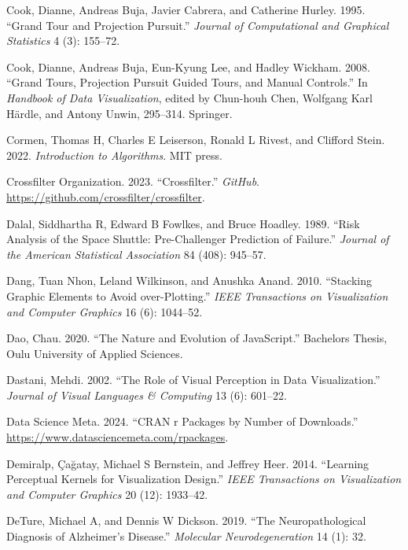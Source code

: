 \documentclass[
  openany]{book}
\newlength{\cslhangindent}
\newenvironment{CSLReferences}[2] %
 {\begin{list}{}{%
  \setlength{\itemindent}{0pt}
  \setlength{\leftmargin}{0pt}
  \setlength{\parsep}{0pt}
  \ifodd #1
   \setlength{\leftmargin}{\cslhangindent}
   \setlength{\itemindent}{-1\cslhangindent}
  \fi
  \setlength{\itemsep}{#2\baselineskip}}}
 {\end{list}}
\theoremstyle{definition}
\theoremstyle{definition}
\theoremstyle{definition}
\theoremstyle{definition}
\theoremstyle{remark}
\begin{document}
\begin{CSLReferences}{1}{0}
Cook, Dianne, Andreas Buja, Javier Cabrera, and Catherine Hurley. 1995. {``Grand Tour and Projection Pursuit.''} \emph{Journal of Computational and Graphical Statistics} 4 (3): 155--72.

Cook, Dianne, Andreas Buja, Eun-Kyung Lee, and Hadley Wickham. 2008. {``Grand Tours, Projection Pursuit Guided Tours, and Manual Controls.''} In \emph{Handbook of Data Visualization}, edited by Chun-houh Chen, Wolfgang Karl Härdle, and Antony Unwin, 295--314. Springer.

Cormen, Thomas H, Charles E Leiserson, Ronald L Rivest, and Clifford Stein. 2022. \emph{Introduction to Algorithms}. MIT press.

Crossfilter Organization. 2023. {``{Crossfilter}.''} \emph{GitHub}. \url{https://github.com/crossfilter/crossfilter}.

Dalal, Siddhartha R, Edward B Fowlkes, and Bruce Hoadley. 1989. {``Risk Analysis of the Space Shuttle: Pre-Challenger Prediction of Failure.''} \emph{Journal of the American Statistical Association} 84 (408): 945--57.

Dang, Tuan Nhon, Leland Wilkinson, and Anushka Anand. 2010. {``Stacking Graphic Elements to Avoid over-Plotting.''} \emph{IEEE Transactions on Visualization and Computer Graphics} 16 (6): 1044--52.

Dao, Chau. 2020. {``The Nature and Evolution of JavaScript.''} Bachelor\textquotesingle s Thesis, Oulu University of Applied Sciences.

Dastani, Mehdi. 2002. {``The Role of Visual Perception in Data Visualization.''} \emph{Journal of Visual Languages \& Computing} 13 (6): 601--22.

Data Science Meta. 2024. {``CRAN r Packages by Number of Downloads.''} \url{https://www.datasciencemeta.com/rpackages}.

Demiralp, Çağatay, Michael S Bernstein, and Jeffrey Heer. 2014. {``Learning Perceptual Kernels for Visualization Design.''} \emph{IEEE Transactions on Visualization and Computer Graphics} 20 (12): 1933--42.

DeTure, Michael A, and Dennis W Dickson. 2019. {``The Neuropathological Diagnosis of Alzheimer's Disease.''} \emph{Molecular Neurodegeneration} 14 (1): 32.


\end{CSLReferences}
\end{document}
